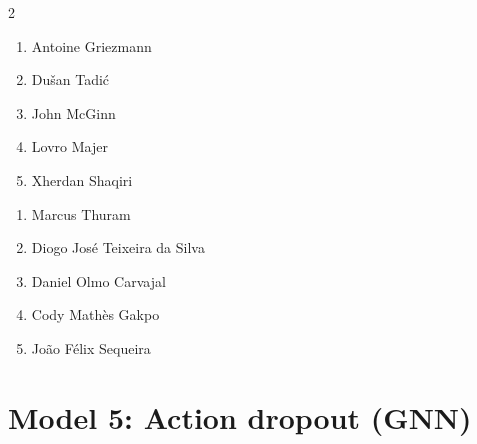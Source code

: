 \documentclass[11pt]{article}
\begin{document}
\begin{multicols}{2}
\begin{samepage}
\begin{tcolorbox}[evalbox,title=\textbf{Lionel Messi (Right Center Forward)} \hfill Score:\ \rule{1cm}{0.4pt}]
\begin{enumerate}
\item Antoine Griezmann
\item Dušan Tadić
\item John McGinn
\item Lovro Majer
\item Xherdan Shaqiri
\end{enumerate}
\end{tcolorbox}
\end{samepage}

\begin{samepage}
\begin{tcolorbox}[evalbox,title=\textbf{Kylian Mbappé (Left Wing)} \hfill Score:\ \rule{1cm}{0.4pt}]
\begin{enumerate}
\item Marcus Thuram
\item Diogo José Teixeira da Silva
\item Daniel Olmo Carvajal
\item Cody Mathès Gakpo
\item João Félix Sequeira
\end{enumerate}
\end{tcolorbox}
\end{samepage}

\end{multicols}

\section*{Model 5: Action dropout (GNN)}
\end{document}
